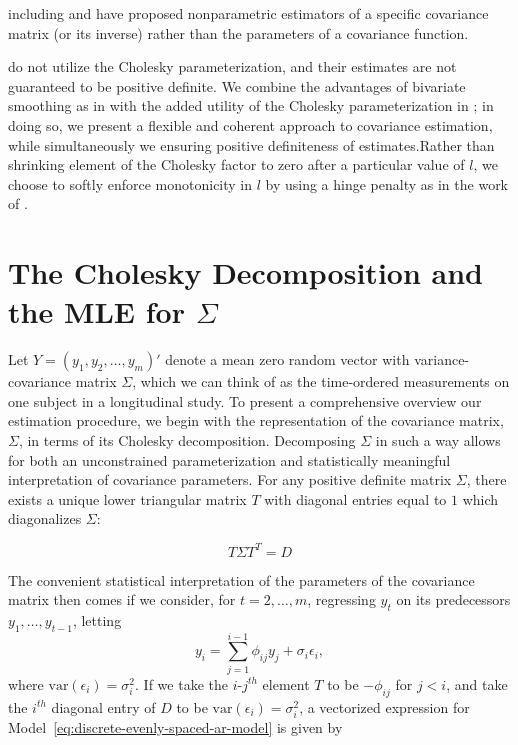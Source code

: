 \documentclass[12pt]{article}
\theoremstyle{definition}
\begin{document}
{{{{including \citet{bickel2008regularized} and \citet{huang2006covariance}  have proposed nonparametric estimators of a specific covariance matrix (or its inverse) rather than the parameters of a covariance function. 

\bigskip

\citet{yao2005functional} do not utilize the Cholesky parameterization, and their estimates are not guaranteed to be positive definite.  We combine the advantages of bivariate smoothing as in \citet{yao2005functional} with the added utility of the Cholesky parameterization in \citet{huang2007estimation}; in doing so, we present a flexible and coherent approach to covariance estimation, while simultaneously we ensuring positive definiteness of estimates.Rather than shrinking element of the Cholesky factor to zero after a particular value of $l$, we choose to softly enforce monotonicity in $l$ by using a hinge penalty as in the work of \citet{tibshirani2011nearly}. 

\section{The Cholesky Decomposition and the MLE for $\Sigma$}

Let $Y = \left( y_{1}, y_{2}, \dots, y_{m} \right)'$ denote a mean zero random vector with variance-covariance matrix $\Sigma$, which we can think of as the time-ordered measurements on one subject in a longitudinal study. To present a comprehensive overview our estimation procedure, we begin with the representation of the covariance matrix, $\Sigma$, in terms of its Cholesky decomposition. Decomposing $\Sigma$ in such a way allows for both an unconstrained parameterization and statistically meaningful interpretation of covariance parameters. For any positive definite matrix $\Sigma$, there exists a unique lower triangular matrix $T$ with diagonal entries equal to $1$ which diagonalizes $\Sigma$:

\begin{equation} \label{eq:T-Sigma-Ttrans-equals-D}
 T \Sigma T^T = D
\end{equation}
\noindent

The convenient statistical interpretation of the parameters of the covariance matrix then comes if we consider, for $t = 2, \dots, m$, regressing $y_t$ on its predecessors $y_1,\dots, y_{t-1}$, letting
\begin{equation} 
{y}_{i}  = \sum_{j=1}^{i-1} \phi_{ij} y_{j} + \sigma_{i}\epsilon_{i} \label{eq:discrete-evenly-spaced-ar-model},
\end{equation}
\noindent
where $\mbox{var}\left( \epsilon_i \right) = \sigma_i^2$. If we take the $i$-$j^{th}$ element $T$ to be $-\phi_{ij}$ for $j < i$, and take the $i^{th}$ diagonal entry of $D$ to be $\mbox{var}\left( \epsilon_i \right) = \sigma_i^2$, a vectorized expression for Model~\ref{eq:discrete-evenly-spaced-ar-model} is given by

}}}}
\end{document}
